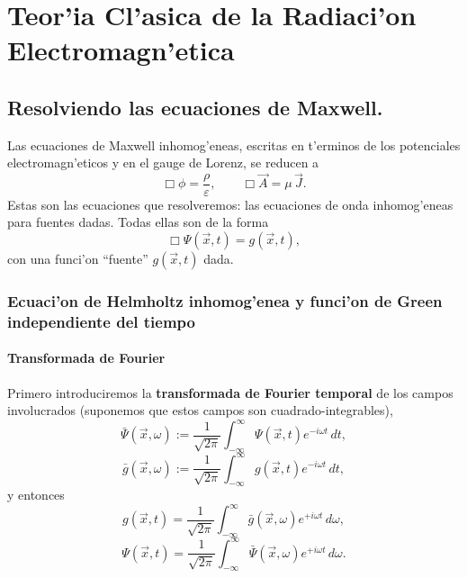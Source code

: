 \chapter{Teor'ia Cl'asica de la Radiaci'on Electromagn'etica}\label{caprad}

\section{Resolviendo las ecuaciones de Maxwell.}\label{resolvmax}

Las ecuaciones de Maxwell inhomog'eneas, escritas en t'erminos de los potenciales electromagn'eticos y en el gauge de Lorenz, se reducen a
\begin{equation}
 \Box\phi=\frac{\rho}{\varepsilon}, \qquad  \Box\vec{A}=\mu\,\vec{J}.
\end{equation}
Estas son las ecuaciones que resolveremos: las ecuaciones de onda
inhomog'eneas para fuentes dadas. Todas ellas son de la forma
\begin{equation}
\Box \Psi(\vec{x},t)=g(\vec{x},t), \label{oih}
\end{equation}
con una funci'on ``fuente'' $g(\vec{x},t)$ dada.


\subsection{Ecuaci'on de Helmholtz inhomog'enea y funci'on de Green independiente del tiempo}
\subsubsection{Transformada de Fourier}
Primero introduciremos la \textbf{transformada de Fourier temporal} de los campos involucrados (suponemos que estos campos son cuadrado-integrables),
\begin{equation}
\bar{\Psi}(\vec{x},\omega):=\frac{1}{\sqrt{2\pi}}\int_{-\infty}^\infty
\Psi(\vec{x},t)e^{-i\omega t}\,dt,
\end{equation}
\begin{equation}
\bar{g}(\vec{x},\omega):=\frac{1}{\sqrt{2\pi}}\int_{-\infty}^\infty
g(\vec{x},t)e^{-i\omega t}\,dt ,
\end{equation}
y entonces
\begin{equation}
g(\vec{x},t)=\frac{1}{\sqrt{2\pi}}\int_{-\infty}^\infty
\bar{g}(\vec{x},\omega)e^{+i\omega t}\,d\omega,
\end{equation}
\begin{equation}
\Psi(\vec{x},t)=\frac{1}{\sqrt{2\pi}}\int_{-\infty}^\infty
\bar{\Psi}(\vec{x},\omega)e^{+i\omega t}\,d\omega.
\end{equation}

